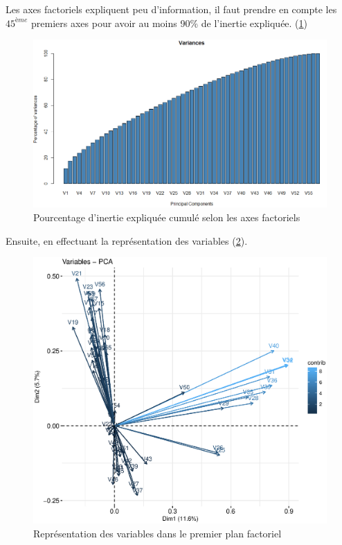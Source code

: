 \documentclass{article}
\begin{document}
Les axes factoriels expliquent peu d'information, il faut prendre en compte les $45^{ème}$ premiers axes pour avoir au moins 90\% de l'inertie expliquée. (\ref{acp_eigen_cum})
 
\begin{figure}[H]
\centering   
    \includegraphics[width=15cm]{img/acp_eigen_cumul.PNG}   
    \caption{Pourcentage d'inertie expliquée cumulé selon les axes factoriels}   
    \label{acp_eigen_cum}   
    
\end{figure} 


Ensuite, en effectuant la représentation des variables (\ref{acp_var}).

\begin{figure}[H]
\centering   
    \includegraphics[scale=0.7]{img/acp_var2.eps}   
    \caption{Représentation des variables dans le premier plan factoriel}   
    \label{acp_var}   
    
\end{figure}
\end{document}
